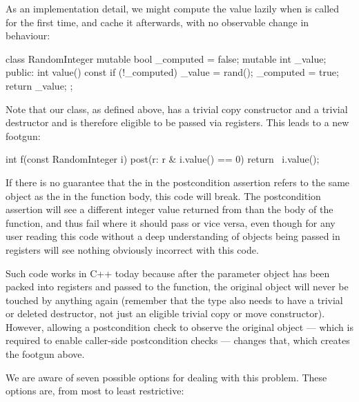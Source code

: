As an implementation detail, we might compute the value lazily when  is called for the first time, and cache it afterwards, with no observable change in behaviour:
 \begin{codeblock}
class RandomInteger {
  mutable bool _computed = false;
  mutable int  _value;
public:
  int value() const {
    if (!_computed) {
      _value = rand();
      _computed = true;
    }
    return _value;
  }
};
 \end{codeblock}
Note that our  class, as defined above, has a trivial copy constructor and a trivial destructor and is therefore eligible to be passed via registers. This leads to a new footgun: 
 \begin{codeblock}
int f(const RandomInteger i)
post(r: r & i.value() == 0) {
  return ~i.value();
}
 \end{codeblock}
If there is no guarantee that the  in the postcondition assertion refers to the same object as the  in the function body, this code will break. The postcondition assertion will see a different integer value returned from  than the body of the function, and thus fail where it should pass or vice versa, even though for any user reading this code without a deep understanding of objects being passed in registers will see nothing obviously incorrect with this code.

Such code works in C++ today because after the parameter object has been packed into registers and passed to the function,  the original object will never be touched by anything again (remember that the type also needs to have a trivial or deleted destructor, not just an eligible trivial copy or move constructor). However, allowing a postcondition check to observe the original object --- which is required to enable caller-side postcondition checks --- changes that, which creates the footgun above.

We are aware of seven possible options for dealing with this problem. These options are, from most to least restrictive:

\renewcommand\labelenumi{R\arabic{enumi}.}
\renewcommand\theenumi\labelenumi

